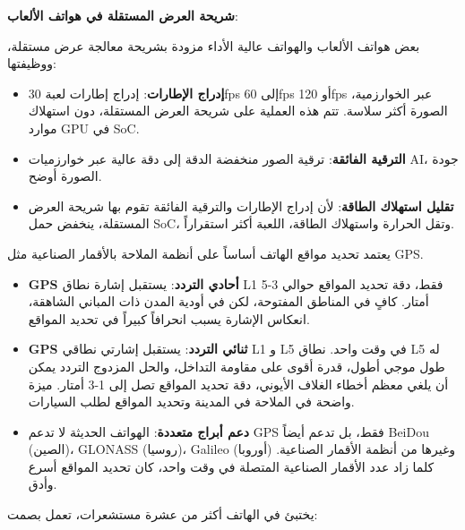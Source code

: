 \textbf{شريحة العرض المستقلة في هواتف الألعاب}:

بعض هواتف الألعاب والهواتف عالية الأداء مزودة بشريحة معالجة عرض مستقلة، ووظيفتها:

\begin{itemize}
  \item \textbf{إدراج الإطارات}: إدراج إطارات لعبة 30fps إلى 60fps أو 120fps عبر الخوارزمية، الصورة أكثر سلاسة. تتم هذه العملية على شريحة العرض المستقلة، دون استهلاك موارد GPU في SoC.
  \item \textbf{الترقية الفائقة}: ترقية الصور منخفضة الدقة إلى دقة عالية عبر خوارزميات AI، جودة الصورة أوضح.
  \item \textbf{تقليل استهلاك الطاقة}: لأن إدراج الإطارات والترقية الفائقة تقوم بها شريحة العرض المستقلة، ينخفض حمل SoC، وتقل الحرارة واستهلاك الطاقة، اللعبة أكثر استقراراً.
\end{itemize}


يعتمد تحديد مواقع الهاتف أساساً على أنظمة الملاحة بالأقمار الصناعية مثل GPS.

\begin{itemize}
  \item \textbf{GPS أحادي التردد}: يستقبل إشارة نطاق L1 فقط، دقة تحديد المواقع حوالي 3-5 أمتار. كافٍ في المناطق المفتوحة، لكن في أودية المدن ذات المباني الشاهقة، انعكاس الإشارة يسبب انحرافاً كبيراً في تحديد المواقع.
  \item \textbf{GPS ثنائي التردد}: يستقبل إشارتي نطاقي L1 و L5 في وقت واحد. نطاق L5 له طول موجي أطول، قدرة أقوى على مقاومة التداخل، والحل المزدوج التردد يمكن أن يلغي معظم أخطاء الغلاف الأيوني، دقة تحديد المواقع تصل إلى 1-3 أمتار. ميزة واضحة في الملاحة في المدينة وتحديد المواقع لطلب السيارات.
  \item \textbf{دعم أبراج متعددة}: الهواتف الحديثة لا تدعم GPS فقط، بل تدعم أيضاً BeiDou (الصين)، GLONASS (روسيا)، Galileo (أوروبا) وغيرها من أنظمة الأقمار الصناعية. كلما زاد عدد الأقمار الصناعية المتصلة في وقت واحد، كان تحديد المواقع أسرع وأدق.
\end{itemize}


يختبئ في الهاتف أكثر من عشرة مستشعرات، تعمل بصمت:

